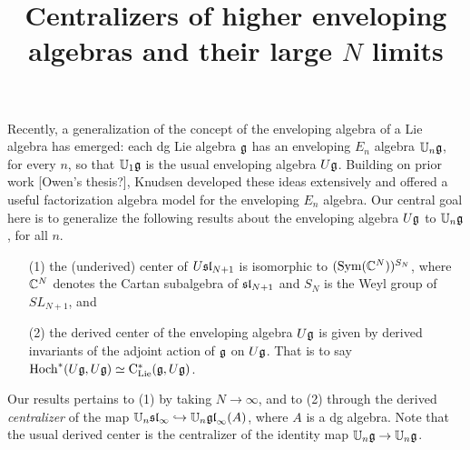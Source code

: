 \documentclass[11pt]{amsart}
\numberwithin{equation}{section}
\begin{document}
\title{Centralizers of higher enveloping algebras and their large $N$ limits}

%


\maketitle
\thispagestyle{empty}

\tableofcontents
 
Recently, a generalization of the concept of the enveloping algebra of a Lie algebra has emerged: each dg Lie algebra $\fg$ has an enveloping $E_n$ algebra $\UU_n\fg$, for every $n$, so that $\UU_1\fg$ is the usual enveloping algebra $U\fg$. Building on prior work \cite{BD, AF} [Owen's thesis?], Knudsen \cite{Knudsen} developed these ideas extensively and offered a useful factorization algebra model for the enveloping $E_n$ algebra. Our central goal here is to generalize the following results about the enveloping algebra $U\fg$ to $\UU_n\fg$, for all $n$.

\begin{enumerate}
\item[(1)] the (underived) center of $U\sl_{N+1}$ is isomorphic to $(\Sym(\CC^{N}))^{S_N}$, where $\CC^{N}$ denotes the Cartan subalgebra of $\sl_{N+1}$ and $S_N$ is the Weyl group of $SL_{N+1}$, and
\item[(2)] the derived center of the enveloping algebra $U\fg$ is given by derived invariants of the adjoint action of $\fg$ on $U\fg$. That is to say $\Hoch^*(U\fg,U\fg) \simeq \clies(\fg, U\fg)$.
\end{enumerate}

Our results pertains to (1) by taking $N \to \infty$, and to (2) through the derived {\em centralizer} of the map $\UU_n\sl_\infty \hookrightarrow \UU_n\gl_\infty(A)$, where $A$ is a dg algebra. Note that the usual derived center is the centralizer of the identity map $\UU_n\fg \to \UU_n\fg$.
\end{document}
